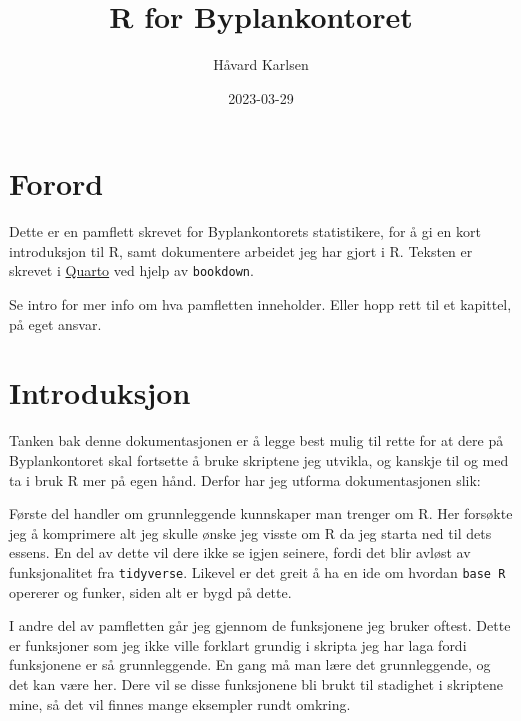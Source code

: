 \documentclass[
  letterpaper,
  DIV=11,
  numbers=noendperiod]{scrreprt}
\title{R for Byplankontoret}
\author{Håvard Karlsen}
\date{2023-03-29}
\renewcommand*\contentsname{Table of contents}
\newcommand\contentsname{Table of contents}
\begin{document}
\maketitle
\ifdefined\Shaded\renewenvironment{Shaded}{\begin{tcolorbox}[breakable, interior hidden, enhanced, boxrule=0pt, borderline west={3pt}{0pt}{shadecolor}, sharp corners, frame hidden]}{\end{tcolorbox}}\fi

\renewcommand*\contentsname{Table of contents}
{
\hypersetup{linkcolor=}
\setcounter{tocdepth}{2}
\tableofcontents
}

\hypertarget{forord}{%
\chapter*{Forord}\label{forord}}


Dette er en pamflett skrevet for Byplankontorets statistikere, for å gi
en kort introduksjon til R, samt dokumentere arbeidet jeg har gjort i R.
Teksten er skrevet i \href{https://quarto.org/docs/books}{Quarto} ved
hjelp av \texttt{bookdown}.

Se intro for mer info om hva pamfletten inneholder. Eller hopp rett til
et kapittel, på eget ansvar.


\hypertarget{introduksjon}{%
\chapter{Introduksjon}\label{introduksjon}}

Tanken bak denne dokumentasjonen er å legge best mulig til rette for at
dere på Byplankontoret skal fortsette å bruke skriptene jeg utvikla, og
kanskje til og med ta i bruk R mer på egen hånd. Derfor har jeg utforma
dokumentasjonen slik:

Første del handler om grunnleggende kunnskaper man trenger om R. Her
forsøkte jeg å komprimere alt jeg skulle ønske jeg visste om R da jeg
starta ned til dets essens. En del av dette vil dere ikke se igjen
seinere, fordi det blir avløst av funksjonalitet fra \texttt{tidyverse}.
Likevel er det greit å ha en ide om hvordan \texttt{base\ R} opererer og
funker, siden alt er bygd på dette.

I andre del av pamfletten går jeg gjennom de funksjonene jeg bruker
oftest. Dette er funksjoner som jeg ikke ville forklart grundig i
skripta jeg har laga fordi funksjonene er så grunnleggende. En gang må
man lære det grunnleggende, og det kan være her. Dere vil se disse
funksjonene bli brukt til stadighet i skriptene mine, så det vil finnes
mange eksempler rundt omkring.
\end{document}

